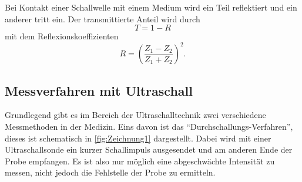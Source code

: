 Bei Kontakt einer Schallwelle mit einem Medium wird ein Teil reflektiert und ein anderer tritt ein.
Der transmittierte Anteil wird durch
\begin{equation}
    T = 1 - R
\end{equation}
mit dem Reflexionskoeffizienten
\begin{equation}
    R = \left( \frac{Z_1 - Z_2}{Z_1 + Z_2} \right)^2.
\end{equation}

\subsection{Messverfahren mit Ultraschall}

Grundlegend gibt es im Bereich der Ultraschalltechnik zwei verschiedene Messmethoden in der Medizin.
Eins davon ist das \enquote{Durchschallungs-Verfahren}, dieses ist schematisch in \autoref{fig:Zeichnung1} dargestellt.
Dabei wird mit einer Ultraschallsonde ein kurzer Schallimpuls ausgesendet und am anderen Ende der Probe empfangen.
Es ist also nur möglich eine abgeschwächte Intensität zu messen, nicht jedoch die Fehlstelle der Probe zu ermitteln. 

